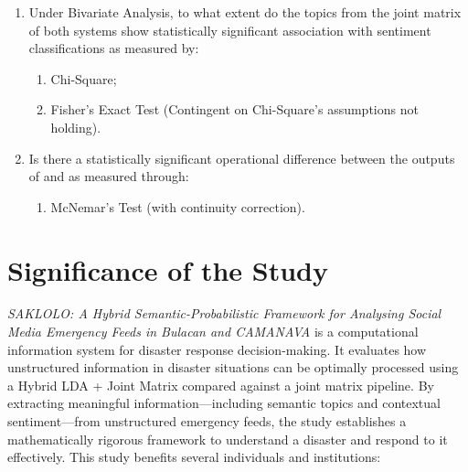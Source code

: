 \begin{enumerate}[label=\arabic*.]
	\item Under Bivariate Analysis, to what extent do the topics from the joint matrix of
	both systems show statistically significant association with sentiment
	classifications as measured by:
	\begin{enumerate}[label=\alph*.]
		\item Chi-Square;
		\item Fisher's Exact Test (Contingent on Chi-Square's assumptions not holding).
	\end{enumerate}
	
	\item Is there a statistically significant operational difference between
	the outputs of \sysA{} and \sysB{} as measured
	through:
	\begin{enumerate}[label=\alph*.]
		\item McNemar's Test (with continuity correction).
	\end{enumerate}
\end{enumerate}

\section*{Significance of the Study}

\emph{SAKLOLO: A Hybrid Semantic-Probabilistic Framework for Analysing Social
	Media Emergency Feeds in Bulacan and CAMANAVA} is a computational information
system for disaster response decision-making. It evaluates how unstructured
information in disaster situations can be optimally processed using a Hybrid
LDA + \xlmr{} Joint Matrix compared against a \qwen{} joint matrix
pipeline. By extracting meaningful information---including semantic topics and
contextual sentiment---from unstructured emergency feeds, the study establishes
a mathematically rigorous framework to understand a disaster and respond to it
effectively. This study benefits several individuals and institutions:

